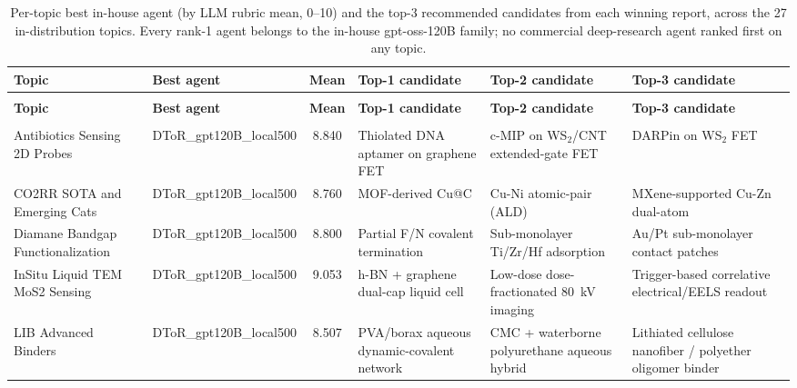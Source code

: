 \begin{longtable}{>{\raggedright\arraybackslash}p{2.2cm}
                  >{\raggedright\arraybackslash}p{1.9cm}
                  c
                  >{\raggedright\arraybackslash}p{3.2cm}
                  >{\raggedright\arraybackslash}p{3.2cm}
                  >{\raggedright\arraybackslash}p{3.2cm}}
  \caption{Per-topic best in-house agent (by LLM rubric mean, 0--10) and the
    top-3 recommended candidates from each winning report, across the 27
    in-distribution topics. Every rank-1 agent belongs to the in-house
    gpt-oss-120B family; no commercial deep-research agent ranked first on any
    topic.}\label{tab:top3-candidates}\\
  \toprule
  \textbf{Topic} & \textbf{Best agent} & \textbf{Mean} &
  \textbf{Top-1 candidate} & \textbf{Top-2 candidate} & \textbf{Top-3 candidate} \\
  \midrule
  \endfirsthead
  \multicolumn{6}{@{}l}{\textit{Table \ref{tab:top3-candidates} (continued)}}\\
  \toprule
  \textbf{Topic} & \textbf{Best agent} & \textbf{Mean} &
  \textbf{Top-1 candidate} & \textbf{Top-2 candidate} & \textbf{Top-3 candidate} \\
  \midrule
  \endhead
  \midrule
  \multicolumn{6}{r@{}}{\textit{continued on next page}}\\
  \endfoot
  \bottomrule
  \endlastfoot
    Antibiotics Sensing 2D Probes & DToR\_\allowbreak gpt120B\_\allowbreak local500 & 8.840 & Thiolated DNA aptamer on graphene FET & c-MIP on WS$_2$/CNT extended-gate FET & DARPin on WS$_2$ FET \\
    CO2RR SOTA and Emerging Cats & DToR\_\allowbreak gpt120B\_\allowbreak local500 & 8.760 & MOF-derived Cu@C & Cu-Ni atomic-pair (ALD) & MXene-supported Cu-Zn dual-atom \\
    Diamane Bandgap Functionalization & DToR\_\allowbreak gpt120B\_\allowbreak local500 & 8.800 & Partial F/N covalent termination & Sub-monolayer Ti/Zr/Hf adsorption & Au/Pt sub-monolayer contact patches \\
    InSitu Liquid TEM MoS2 Sensing & DToR\_\allowbreak gpt120B\_\allowbreak local500 & 9.053 & h-BN + graphene dual-cap liquid cell & Low-dose dose-fractionated 80~kV imaging & Trigger-based correlative electrical/EELS readout \\
    LIB Advanced Binders & DToR\_\allowbreak gpt120B\_\allowbreak local500 & 8.507 & PVA/borax aqueous dynamic-covalent network & CMC + waterborne polyurethane aqueous hybrid & Lithiated cellulose nanofiber / polyether oligomer binder \\

\end{longtable}

